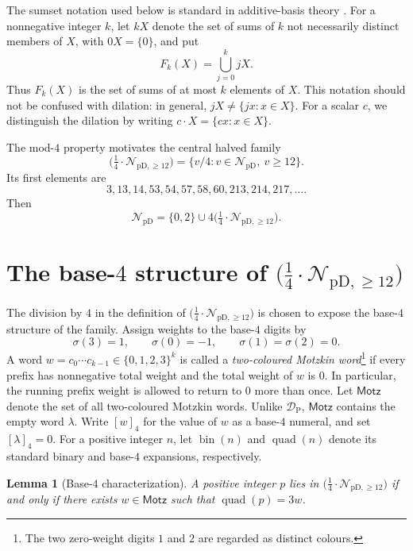 \documentclass[12pt]{article}
\theoremstyle{plain}
\newtheorem{lemma}[theorem]{Lemma}
\theoremstyle{definition}
\theoremstyle{plain}
\newcommand{\NpD}{\mathcal{N}_{\mathrm{pD}}}
\newcommand{\DP}{\mathcal{D}_{\mathrm{P}}}
\newcommand{\Pset}{%
  \bigl(\tfrac{1}{4}\cdot\mathcal{N}_{\mathrm{pD},\geq 12}\bigr)%
}
\begin{document}
The sumset notation used below is standard in additive-basis theory
\cite[Chap.\ 1]{Nathanson}.  For a nonnegative integer $k$, let $kX$ denote the
set of sums of $k$ not necessarily distinct members of $X$, with
$0X=\{0\}$, and put
\[
 F_k(X)=\bigcup_{j=0}^{k}jX.
\]
Thus $F_k(X)$ is the set of sums of at most $k$ elements of $X$.  This
notation should not be confused with dilation: in general,
$jX\neq\{jx:x\in X\}$.  For a scalar $c$, we distinguish the dilation by
writing $c\cdot X=\{cx:x\in X\}$.

The mod-$4$ property motivates the central halved family
\begin{equation}\label{eq:P-def}
 \Pset=\{v/4:v\in\NpD,\ v\geq12\}.
\end{equation}
Its first elements are
\[
 3,13,14,53,54,57,58,60,213,214,217,\ldots.
\]
Then
\begin{equation}\label{eq:NpD-decomp}
 \NpD=\{0,2\}\cup4\Pset.
\end{equation}


\section{The base-\texorpdfstring{$4$}{4} structure of
\texorpdfstring{$\Pset$}{P}}\label{sec:base4}

The division by $4$ in the definition of $\Pset$ is chosen to expose the
base-$4$ structure of the family.  Assign weights to the base-$4$ digits by
\[
  \sigma(3)=1,\qquad \sigma(0)=-1,\qquad
  \sigma(1)=\sigma(2)=0.
\]
A word $w=c_0\cdots c_{k-1}\in\{0,1,2,3\}^{k}$ is called a
\emph{two-coloured Motzkin word}\footnote{The two zero-weight digits $1$
and $2$ are regarded as distinct colours.} if every prefix has nonnegative
total weight and the total weight of $w$ is $0$.  In particular, the running
prefix weight is allowed to return to $0$ more than once.  Let $\mathsf{Motz}$
denote the set of all two-coloured Motzkin words.  Unlike $\DP$,
$\mathsf{Motz}$ contains the empty word $\lambda$.  Write $[w]_4$ for the
value of $w$ as a base-$4$ numeral, and set $[\lambda]_4=0$.  For a positive
integer $n$, let $\operatorname{bin}(n)$ and $\operatorname{quad}(n)$ denote
its standard binary and base-$4$ expansions, respectively.

\begin{lemma}[Base-$4$ characterization]\label{lem:base4}
A positive integer $p$ lies in $\Pset$ if and only if there exists
$w\in\mathsf{Motz}$ such that $\operatorname{quad}(p)=3w$.
\end{lemma}
\end{document}

